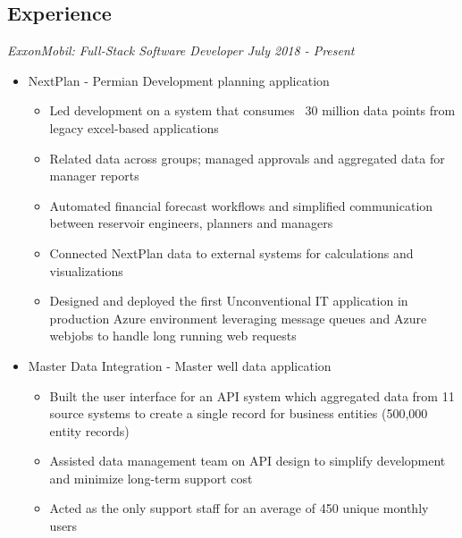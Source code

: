 \documentclass[line,overlapped,9pt]{res}
\begin{document}
\setlength\itemsep{.25em}
\address{Email: kllinzy1@gmail.com}
\address{Mobile: (918)440-3563}

\begin{resume}

  \section{Experience} {\sl ExxonMobil: Full-Stack Software Developer \hfill July 2018 - \sl Present}
                 \begin{itemize}[leftmargin=*]   %
                  \setlength\itemsep{.1em}
                 \item[] NextPlan - Permian Development planning application
                   \begin{itemize}
                  \setlength\itemsep{.1em}
                   \item Led development on a system that consumes ~30 million data points from legacy excel-based applications
                   \item Related data across groups; managed approvals and aggregated data for manager reports
                   \item Automated financial forecast workflows and simplified communication between reservoir engineers, planners and managers
                   \item Connected NextPlan data to external systems for calculations and visualizations 
                   \item Designed and deployed the first Unconventional IT application in production Azure environment leveraging message queues and Azure webjobs to handle long running web requests 
                  \end{itemize}
                 \item[] Master Data Integration - Master well data application
                   \begin{itemize}
                  \setlength\itemsep{.1em}
                   \item Built the user interface for an API system which aggregated data from 11 source systems to create a single record for business entities (500,000 entity records) 
                   \item Assisted data management team on API design to simplify development and minimize long-term support cost  
                   \item Acted as the only support staff for an average of 450 unique monthly users    

\end{itemize}
\end{itemize}
\end{resume}
\end{document}
